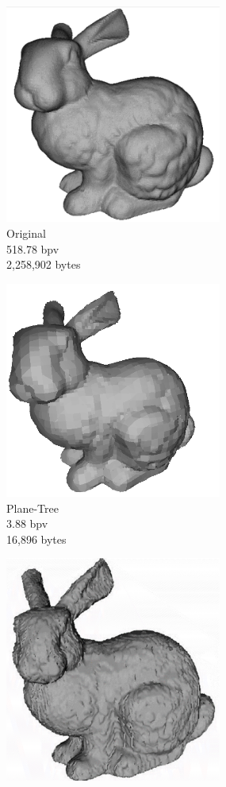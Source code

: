 \begin{figure}[H] 
        \begin{center}
 		\begin{subfigure}[b]{3in}
 			   \centering
 			   \includegraphics[width=2.8in]{images/experiments/pt_qual/original1}
                \caption{Original\\518.78 bpv\\2,258,902 bytes}
                \label{fig:FIG_BUNNYB}
        \end{subfigure}%
        \begin{subfigure}[b]{3in}
                \includegraphics[width=2.8in]{images/experiments/pt_qual/planetree_shade}
                \caption{Plane-Tree\\3.88 bpv\\16,896 bytes}
                \label{fig:FIG_RABBITB}
        \end{subfigure}
        \begin{subfigure}[b]{3in}
                \includegraphics[width=2.8in]{images/experiments/pt_qual/tg}

\end{subfigure}
\end{center}
\end{figure}
